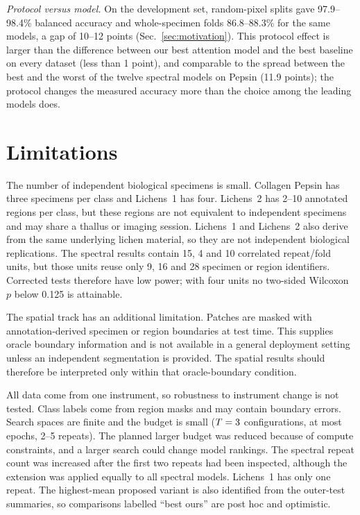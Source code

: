 \documentclass[journal]{IEEEtran}
\begin{document}
\emph{Protocol versus model.} On the development set, random-pixel splits gave 97.9--98.4\% balanced accuracy and whole-specimen folds 86.8--88.3\% for the same models, a gap of 10--12 points (Sec.~\ref{sec:motivation}). This protocol effect is larger than the difference between our best attention model and the best baseline on every dataset (less than 1 point), and comparable to the spread between the best and the worst of the twelve spectral models on Pepsin (11.9 points); the protocol changes the measured accuracy more than the choice among the leading models does.

\section{Limitations}\label{sec:limits}
The number of independent biological specimens is small. Collagen Pepsin has three specimens per class and Lichens~1 has four. Lichens~2 has 2--10 annotated regions per class, but these regions are not equivalent to independent specimens and may share a thallus or imaging session. Lichens~1 and Lichens~2 also derive from the same underlying lichen material, so they are not independent biological replications. The spectral results contain 15, 4 and 10 correlated repeat/fold units, but those units reuse only 9, 16 and 28 specimen or region identifiers. Corrected tests therefore have low power; with four units no two-sided Wilcoxon $p$ below 0.125 is attainable.

The spatial track has an additional limitation. Patches are masked with annotation-derived specimen or region boundaries at test time. This supplies oracle boundary information and is not available in a general deployment setting unless an independent segmentation is provided. The spatial results should therefore be interpreted only within that oracle-boundary condition.

All data come from one instrument, so robustness to instrument change is not tested. Class labels come from region masks and may contain boundary errors. Search spaces are finite and the budget is small ($T=3$ configurations, at most \MaxEpochsE{} epochs, 2--5 repeats). The planned larger budget was reduced because of compute constraints, and a larger search could change model rankings. The spectral repeat count was increased after the first two repeats had been inspected, although the extension was applied equally to all spectral models. Lichens~1 has only one repeat. The highest-mean proposed variant is also identified from the outer-test summaries, so comparisons labelled ``best ours'' are post hoc and optimistic.
\end{document}
